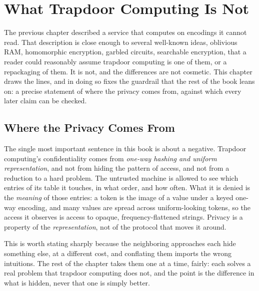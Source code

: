 
\chapter{What Trapdoor Computing Is Not}
\label{ch:what-it-is-not}

The previous chapter described a service that computes on encodings it
cannot read. That description is close enough to several well-known ideas,
oblivious RAM, homomorphic encryption, garbled circuits, searchable
encryption, that a reader could reasonably assume trapdoor computing is one
of them, or a repackaging of them. It is not, and the differences are not
cosmetic. This chapter draws the lines, and in doing so fixes the
guardrail that the rest of the book leans on: a precise statement of where
the privacy comes from, against which every later claim can be checked.

\section{Where the Privacy Comes From}
\label{sec:privacy-source}

The single most important sentence in this book is about a negative.
Trapdoor computing's confidentiality comes from \emph{one-way hashing and
uniform representation}, and not from hiding the pattern of access, and not
from a reduction to a hard problem. The untrusted machine is allowed to see
which entries of its table it touches, in what order, and how often. What
it is denied is the \emph{meaning} of those entries: a token is the image
of a value under a keyed one-way encoding, and many values are spread
across uniform-looking tokens, so the access it observes is access to
opaque, frequency-flattened strings. Privacy is a property of the
\emph{representation}, not of the protocol that moves it around.

This is worth stating sharply because the neighboring approaches each hide
something else, at a different cost, and conflating them imports the wrong
intuitions. The rest of the chapter takes them one at a time, fairly: each
solves a real problem that trapdoor computing does not, and the point is
the difference in what is hidden, never that one is simply better.

